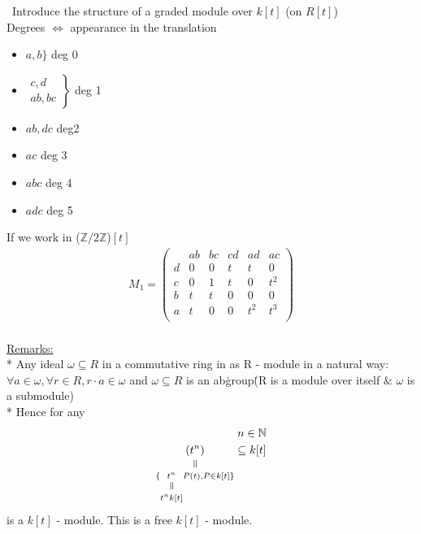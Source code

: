 \documentclass[11pt,a4paper]{report}
\newcommand{\verteq}{\rotatebox{90}{$\,=$}}
\newcommand{\equalto}[2]{\underset{\scriptstyle\overset{\mkern4mu\verteq}{#2}}{#1}}
\begin{document}
              \
              Introduce the structure of a graded module over $k[t]$ (on $R[t]$)\\
              Degrees $\iff$ appearance in the translation\\
              \begin{itemize}
              \item $a,b \}$ deg 0
              \item $\left.\begin{array}{c}c,d\\ab,bc\end{array}\right\}$ deg 1
              \item $ab, dc$ deg2
              \item $ac$ deg 3
              \item $abc$ deg 4
              \item $adc$ deg 5
              \end{itemize}
              If we work in ($\mathbb{Z}/2\mathbb{Z}$)$[t]$\\
              \begin{align*}
                M_1 = \left(\begin{array}{c|ccccc}
                        &ab&bc&cd&ad&ac\\\hline
                        d&0&0&t&t&0\\
                        c&0&1&t&0&t^2\\
                        b&t&t&0&0&0\\
                        a&t&0&0&t^2&t^3\\
                      \end{array}\right)
              \end{align*}
              \\
              \underline{Remarks:}\\
              * Any ideal $\omega \subseteq R$ in a commutative ring in as R - module in a natural way: $\forall a \in \omega, \forall r \in R, r\cdot a \in \omega$ and $\omega \subseteq R$ is an ab\. group\. (R is a module over itself \& $\omega$ is a submodule)\\
              * Hence for any
              \begin{align*}
                n \in \mathbb{N}\\
                \equalto{(t^n)}{\{\equalto{t^n}{t^nk[t]} P(t), P \in k[t]\}} \subseteq k[t]
              \end{align*}
              is a $k[t]$ - module. This is a free $k[t]$ - module.\\
\end{document}
